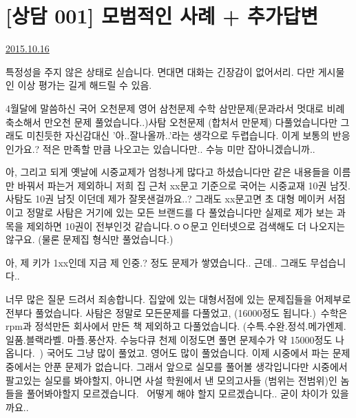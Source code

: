 


\section{[상담 001] 모범적인 사례 + 추가답변}
\href{https://www.kockoc.com/index.php?mid=Apoc&search_target=title_content&search_keyword=상담&page=5&division=-810609&last_division=0&document_srl=418912}{2015.10.16}

\vspace{5mm}


특정성을 주지 않은 상태로 싣습니다.
면대면 대화는 긴장감이 없어서리.
다만 게시물인 이상 평가는 길게 해드릴 수 있음.
\vspace{5mm}

4월달에 말씀하신 국어 오천문제 영어 삼천문제 수학 삼만문제(문과라서 멋대로 비례축소해서 만오천 문제 풀었습니다..)사탐 오천문제 (합처서 만문제) 다풀었습니다만 그래도 미친듯한 자신감대신 '아..잘나올까..'라는 생각으로 두렵습니다. 이게 보통의 반응인가요.?
적은 만족할 만큼 나오고는 있습니다만.. 수능 미만 잡아니겠습니까..
\vspace{5mm}

아, 그리고 되게 옛날에 시중교제가 엄청나게 많다고 하셨습니다만 같은 내용들을 이름만 바꿔서 파는거 제외하니 저희 집 근처 xx문고 기준으로 국어는 시중교재 10권 남짓. 사탐도 10권 남짓 이던데 제가 잘못샌걸까요..? 그래도 xx문고면 초 대형 메이커 서점이고 정말로 사탐은 거기에 있는 모든 브랜드를 다 풀었습니다만 실제로 제가 보는 과목을 제외하면 10권이 전부인것 같습니다.ㅇㅇ문고 인터넷으로 검색해도 더 나오지는 않구요. (물론 문제집 형식만 풀었습니다.)
\vspace{5mm}

아, 제 키가 1xx인데 지금 제 인중.? 정도 문제가 쌓였습니다.. 근데.. 그래도 무섭습니다..
\vspace{5mm}

너무 많은 질문 드려서 죄송합니다.
집앞에 있는 대형서점에 있는 문제집들을 어제부로 전부다 풀었습니다. 사탐은 정말로 모든문제를 다풀었고, (16000정도 됩니다.) 수학은 rpm과 정석만든 회사에서 만든 책 제외하고 다풀었습니다. (수특.수완.정석.메가엔제.일품.블랙라벨. 마플.풍산자. 수능다큐 천제 이정도면 풀면 문제수가 약 15000정도 나옵니다. ) 국어도 그냥 많이 풀었고. 영어도 많이 풀었습니다. 이제 시중에서 파는 문제중에서는 안푼 문제가 없습니다.
그래서 앞으로 실모를 풀어볼 생각입니다만 시중에서 팔고있는 실모를 봐야할지, 아니면 사설 학원에서 낸 모의고사들 (범위는 전범위)인 놈들을 풀어봐야할지 모르겠습니다.  어떻게 해야 할지 모르겠습니다.. 굳이 차이가 있을까요..
\vspace{5mm}

